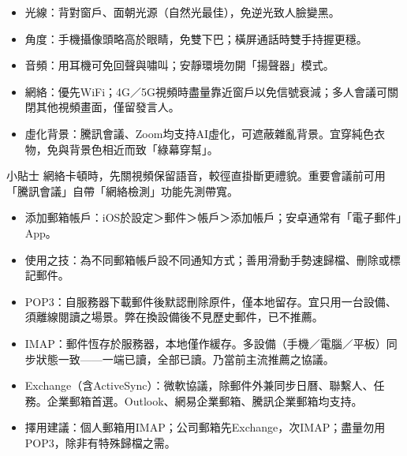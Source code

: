 
\begin{itemize}
  \item 光線：背對窗戶、面朝光源（自然光最佳），免逆光致人臉變黑。
  \item 角度：手機攝像頭略高於眼睛，免雙下巴；橫屏通話時雙手持握更穩。
  \item 音頻：用耳機可免回聲與嘯叫；安靜環境勿開「揚聲器」模式。
  \item 網絡：優先WiFi；4G／5G視頻時盡量靠近窗戶以免信號衰減；多人會議可關閉其他視頻畫面，僅留發言人。
  \item 虛化背景：騰訊會議、Zoom均支持AI虛化，可遮蔽雜亂背景。宜穿純色衣物，免與背景色相近而致「綠幕穿幫」。
\end{itemize}

\begin{tcbinfo}{小貼士}
網絡卡頓時，先關視頻保留語音，較徑直掛斷更禮貌。重要會議前可用「騰訊會議」自帶「網絡檢測」功能先測帶寬。

\end{tcbinfo}


\begin{itemize}
  \item 添加郵箱帳戶：iOS於設定＞郵件＞帳戶＞添加帳戶；安卓通常有「電子郵件」App。
  \item 使用之技：為不同郵箱帳戶設不同通知方式；善用滑動手勢速歸檔、刪除或標記郵件。
\end{itemize}


\begin{itemize}
  \item POP3：自服務器下載郵件後默認刪除原件，僅本地留存。宜只用一台設備、須離線閱讀之場景。弊在換設備後不見歷史郵件，已不推薦。
  \item IMAP：郵件恆存於服務器，本地僅作緩存。多設備（手機／電腦／平板）同步狀態一致——一端已讀，全部已讀。乃當前主流推薦之協議。
  \item Exchange（含ActiveSync）：微軟協議，除郵件外兼同步日曆、聯繫人、任務。企業郵箱首選。Outlook、網易企業郵箱、騰訊企業郵箱均支持。
  \item 擇用建議：個人郵箱用IMAP；公司郵箱先Exchange，次IMAP；盡量勿用POP3，除非有特殊歸檔之需。
\end{itemize}


